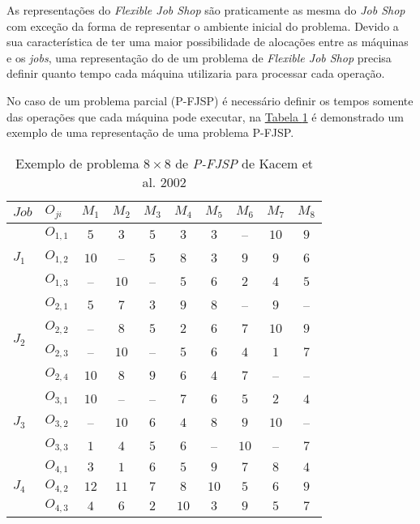 As representações do \textit{Flexible Job Shop} são praticamente as mesma do \textit{Job Shop} com exceção da forma de representar o ambiente inicial do problema. 
Devido a sua característica de ter uma maior possibilidade de alocações entre as máquinas e os \textit{jobs}, 
%
uma representação do de um problema de \textit{Flexible Job Shop} precisa definir quanto tempo cada máquina utilizaria para processar cada operação.


No caso de um problema parcial (P-FJSP) é necessário definir os tempos somente das operações que cada máquina pode executar, na 
\hyperref[tab:ex-instancia-problema-PFJSP]{Tabela \ref{tab:ex-instancia-problema-PFJSP}}
é demonstrado um exemplo de uma representação de uma problema P-FJSP.
\begin{table}[htb]
  \centering
  \caption{Exemplo de problema $8\times8$ de \textit{P-FJSP} de Kacem et al. 2002}
  \label{tab:ex-instancia-problema-PFJSP}
  \begin{tabular}{llcccccccc}
\hline
$Job$ & $O_{ji}$  & $M_1$ & $M_2$ & $M_3$ & $M_4$ & $M_5$ & $M_6$ & $M_7$ & $M_8$ \\
\hline
\multirow{3}{*}{$J_{1}$} & $O_{1,1}$ & $5$ & $3$ & $5$ & $3$ & $3$ & -- & $10$ & $9$\\
& $O_{1,2}$ & $10$ & -- & $5$ & $8$ & $3$ & $9$ & $9$ & $6$\\
& $O_{1,3}$ & -- & $10$ & -- & $5$ & $6$ & $2$ & $4$ & $5$\\
\multirow{4}{*}{$J_{2}$} & $O_{2,1}$ & $5$ & $7$ & $3$ & $9$ & $8$ & -- & $9$ & --\\
& $O_{2,2}$ & -- & $8$ & $5$ & $2$ & $6$ & $7$ & $10$ & $9$\\
& $O_{2,3}$ & -- & $10$ & -- & $5$ & $6$ & $4$ & $1$ & $7$\\
& $O_{2,4}$ & $10$ & $8$ & $9$ & $6$ & $4$ & $7$ & -- & --\\
\multirow{3}{*}{$J_{3}$} & $O_{3,1}$ & $10$ & -- & -- & $7$ & $6$ & $5$ & $2$ & $4$\\
& $O_{3,2}$ & -- & $10$ & $6$ & $4$ & $8$ & $9$ & $10$ & --\\
& $O_{3,3}$ & $1$ & $4$ & $5$ & $6$ & -- & $10$ & -- & $7$\\
\multirow{3}{*}{$J_{4}$} & $O_{4,1}$ & $3$ & $1$ & $6$ & $5$ & $9$ & $7$ & $8$ & $4$\\
& $O_{4,2}$ & $12$ & $11$ & $7$ & $8$ & $10$ & $5$ & $6$ & $9$\\
& $O_{4,3}$ & $4$ & $6$ & $2$ & $10$ & $3$ & $9$ & $5$ & $7$\\

\end{tabular}
\end{table}

